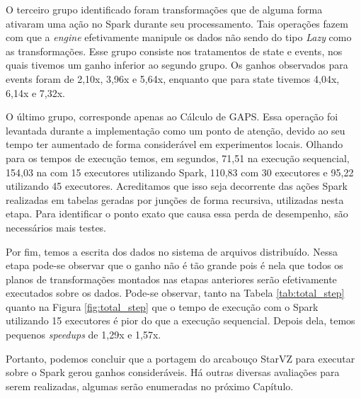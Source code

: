 O terceiro grupo identificado foram transformações que de alguma forma ativaram 
uma ação no Spark durante seu processamento. Tais operações fazem com que a 
\textit{engine} efetivamente manipule os dados \cite{ref:sparkbook} não sendo 
do tipo \textit{Lazy} como as transformações. Esse grupo consiste nos 
tratamentos de state e events, nos quais tivemos um ganho inferior ao segundo 
grupo. Os ganhos observados para events foram de 2,10x, 3,96x e 5,64x, enquanto 
que para state tivemos 4,04x, 6,14x e 7,32x.

O último grupo, corresponde apenas ao Cálculo de GAPS. Essa operação foi 
levantada durante a implementação como um ponto de atenção, devido ao seu tempo 
ter aumentado de forma considerável em experimentos locais. Olhando para os 
tempos de execução temos, em segundos, 71,51 na execução sequencial, 154,03 na 
com 15 executores utilizando Spark, 110,83 com 30 executores e 95,22 utilizando 
45 executores. Acreditamos que isso seja decorrente das ações Spark realizadas 
em tabelas geradas por junções de forma recursiva, utilizadas nesta etapa. Para 
identificar o ponto exato que causa essa perda de desempenho, são necessários 
mais testes.

Por fim, temos a escrita dos dados no sistema de arquivos distribuído. Nessa 
etapa pode-se observar que o ganho não é tão grande pois é nela que todos os 
planos de transformações montados nas etapas anteriores serão efetivamente 
executados sobre os dados. Pode-se observar, tanto na Tabela 
\ref{tab:total_step} quanto na Figura \ref{fig:total_step} que o tempo de 
execução com o Spark utilizando 15 executores é pior do que a execução 
sequencial. Depois dela, temos pequenos \textit{speedups} de 1,29x e 1,57x.

Portanto, podemos concluir que a portagem do arcabouço StarVZ para executar 
sobre o Spark gerou ganhos consideráveis. Há outras diversas avaliações para 
serem realizadas, algumas serão enumeradas no próximo Capítulo.



